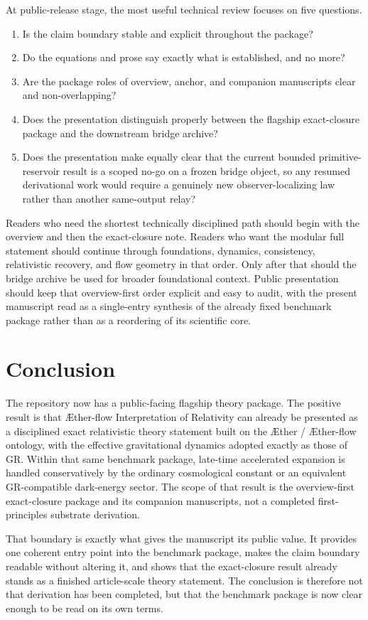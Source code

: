 \documentclass[11pt]{article}
\newcommand{\Aether}{\AE{}ther}
\newcommand{\Aflow}{\AE{}ther-flow}
\newcommand{\TheoryName}{\Aflow{} Interpretation of Relativity}
\begin{document}
At public-release stage, the most useful technical review focuses on five questions.
\begin{enumerate}
    \item Is the claim boundary stable and explicit throughout the package?
    \item Do the equations and prose say exactly what is established, and no more?
    \item Are the package roles of overview, anchor, and companion manuscripts clear and non-overlapping?
    \item Does the presentation distinguish properly between the flagship exact-closure package and the downstream bridge archive?
    \item Does the presentation make equally clear that the current bounded primitive-reservoir result is a scoped no-go on a frozen bridge object, so any resumed derivational work would require a genuinely new observer-localizing law rather than another same-output relay?
\end{enumerate}

Readers who need the shortest technically disciplined path should begin with the overview and then the exact-closure note. Readers who want the modular full statement should continue through foundations, dynamics, consistency, relativistic recovery, and flow geometry in that order. Only after that should the bridge archive be used for broader foundational context.
Public presentation should keep that overview-first order explicit and easy to audit, with the present manuscript read as a single-entry synthesis of the already fixed benchmark package rather than as a reordering of its scientific core.

\section{Conclusion}

The repository now has a public-facing flagship theory package. The positive result is that \TheoryName{} can already be presented as a disciplined exact relativistic theory statement built on the \Aether{} / \Aflow{} ontology, with the effective gravitational dynamics adopted exactly as those of GR. Within that same benchmark package, late-time accelerated expansion is handled conservatively by the ordinary cosmological constant or an equivalent GR-compatible dark-energy sector. The scope of that result is the overview-first exact-closure package and its companion manuscripts, not a completed first-principles substrate derivation.

That boundary is exactly what gives the manuscript its public value. It provides one coherent entry point into the benchmark package, makes the claim boundary readable without altering it, and shows that the exact-closure result already stands as a finished article-scale theory statement. The conclusion is therefore not that derivation has been completed, but that the benchmark package is now clear enough to be read on its own terms.


\end{document}
